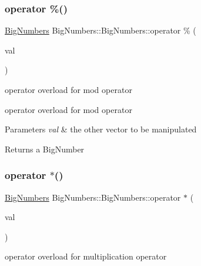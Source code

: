 \subsubsection{\texorpdfstring{operator \%()}{operator \%()}}
{\footnotesize\ttfamily \mbox{\hyperlink{class_big_numbers_1_1_big_numbers}{Big\+Numbers}} Big\+Numbers\+::\+Big\+Numbers\+::operator \% (\begin{DoxyParamCaption}\item[{\mbox{\hyperlink{class_big_numbers_1_1_big_numbers}{Big\+Numbers}} \&}]{val }\end{DoxyParamCaption})}



operator overload for mod operator 

operator overload for mod operator


\begin{DoxyParams}{Parameters}
{\em val} & the other vector to be manipulated \\
\hline
\end{DoxyParams}
\begin{DoxyReturn}{Returns}
a Big\+Number 
\end{DoxyReturn}
\mbox{\label{class_big_numbers_1_1_big_numbers_afca660b90d4ff79406328e6c47b35f02}} 
\subsubsection{\texorpdfstring{operator $\ast$()}{operator *()}}
{\footnotesize\ttfamily \mbox{\hyperlink{class_big_numbers_1_1_big_numbers}{Big\+Numbers}} Big\+Numbers\+::\+Big\+Numbers\+::operator $\ast$ (\begin{DoxyParamCaption}\item[{\mbox{\hyperlink{class_big_numbers_1_1_big_numbers}{Big\+Numbers}} \&}]{val }\end{DoxyParamCaption})}

operator overload for multiplication operator \mbox{\label{class_big_numbers_1_1_big_numbers_ab72d9ad5f9eafd871a6c886aa030363b}} 
